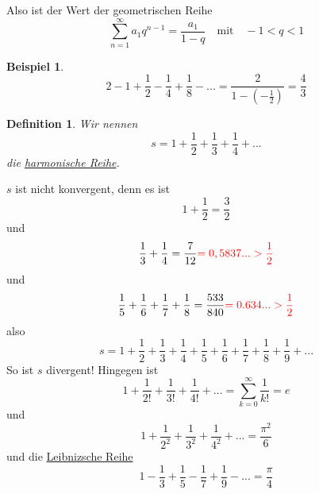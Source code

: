 \documentclass{report}
\newtheorem{mydef}{Definition}
\newtheorem{myexample}{Beispiel}
\begin{document}
Also ist der Wert der geometrischen Reihe
\begin{equation}\sum_{n=1}^{\infty}a_1q^{n-1} = \frac{a_1}{1-q} \quad \mbox{mit} \quad -1 < q < 1\end{equation}
\begin{myexample}\begin{equation}2 - 1 + \frac{1}{2} - \frac{1}{4} + \frac{1}{8} - ... = \frac{2}{1-(-\frac{1}{2})} = \frac{4}{3}\end{equation}\end{myexample}
\begin{mydef}Wir nennen
\begin{equation}s = 1 + \frac{1}{2} + \frac{1}{3} + \frac{1}{4} + ...\end{equation}
die \underline{harmonische Reihe}.\end{mydef}
$s$ ist nicht konvergent, denn es ist
\begin{equation}1 + \frac{1}{2} = \frac{3}{2}\end{equation}
und
\begin{equation}\frac{1}{3} + \frac{1}{4} = \frac{7}{12} \textcolor{red}{ = 0,5837... > \frac{1}{2}}\end{equation}
und
\begin{equation}\frac{1}{5} + \frac{1}{6} + \frac{1}{7} + \frac{1}{8} = \frac{533}{840} \textcolor{red}{ = 0.634... > \frac{1}{2}}\end{equation}
also
\begin{equation}s = 1 + \frac{1}{2} + \frac{1}{3} +\frac{1}{4} +\frac{1}{5} +\frac{1}{6} +\frac{1}{7} +\frac{1}{8} +\frac{1}{9} + ...\end{equation}
So ist $s$ divergent! Hingegen ist
\begin{equation}1 + \frac{1}{2!} +\frac{1}{3!} +\frac{1}{4!} + ... = \sum_{k=0}^{\infty} \frac{1}{k!} = e\end{equation}
und
\begin{equation}1 + \frac{1}{2^2} +\frac{1}{3^2} +\frac{1}{4^2} + ... = \frac{\pi^2}{6}\end{equation}
und die \underline{Leibnizsche Reihe}
\begin{equation}1 - \frac{1}{3} +\frac{1}{5} -\frac{1}{7} + \frac{1}{9} - ... = \frac{\pi}{4}\end{equation}
\end{document}
